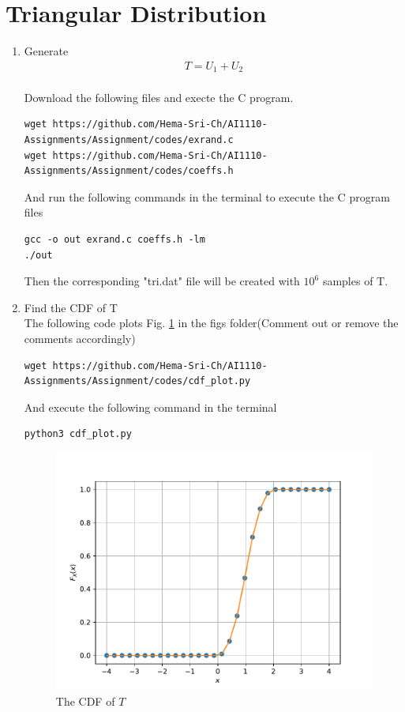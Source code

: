 \documentclass[journal,12pt,twocolumn]{article}
\renewcommand\thesection{\arabic{section}}
\begin{document}
\section{Triangular Distribution}
\begin{enumerate}[label=\thesection.\arabic*
,ref=\thesection.\theenumi]
%
\item
Generate
\begin{align}
	T = U_1 + U_2
\end{align}
\\
\solution Download the following files and execte the C program.
\begin{lstlisting}
wget https://github.com/Hema-Sri-Ch/AI1110-Assignments/Assignment/codes/exrand.c
wget https://github.com/Hema-Sri-Ch/AI1110-Assignments/Assignment/codes/coeffs.h
\end{lstlisting}
And run the following commands in the terminal to execute the C program files
\begin{lstlisting}
gcc -o out exrand.c coeffs.h -lm
./out
\end{lstlisting}
Then the corresponding "tri.dat" file will be created with $10^6$ samples of T.
\\
\item
Find the CDF of T
\\
\solution The following code plots Fig. \ref{fig:tri_cdf} in the figs folder(Comment out or remove the comments accordingly)
\begin{lstlisting}
wget https://github.com/Hema-Sri-Ch/AI1110-Assignments/Assignment/codes/cdf_plot.py
\end{lstlisting}
And execute the following command in the terminal 
\begin{lstlisting}
python3 cdf_plot.py
\end{lstlisting}
\begin{figure}[h]
	\centering
	\includegraphics[width=\columnwidth]{tri_cdf}
	\caption{The CDF of $T$}
	\label{fig:tri_cdf}
\end{figure}


\end{enumerate}
\end{document}
